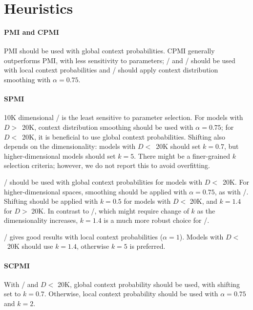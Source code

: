 \documentclass[11pt]{article}
\begin{document}

\section{Heuristics}

\paragraph{PMI and CPMI}

PMI should be used with global context probabilities. CPMI generally outperforms PMI, with less sensitivity to parameters; \NCPMI/ and \logNCPMI/ should be used with local context probabilities and \CPMI/ should apply context distribution smoothing with $\alpha = 0.75$.

\paragraph{SPMI}

10K dimensional \SPMI/ is the least sensitive to parameter selection. For models with $D>$~20K, context distribution smoothing should be used with $\alpha = 0.75$; for $D<$~20K, it is beneficial to use global context probabilities. Shifting also depends on the dimensionality: models with $D<$~20K should set $k = 0.7$, but higher-dimensional models should set $k = 5$. There might be a finer-grained $k$ selection criteria; however, we do not report this to avoid overfitting.

\logNSPMI/ should be used with global context probabilities for models with $D<$~20K. For higher-dimensional spaces, smoothing should be applied with $\alpha = 0.75$, as with \SPMI/. Shifting should be applied with $k = 0.5$ for models with $D<$ 20K,  and $k = 1.4$ for $D>$ 20K. In contrast to \SPMI/, which might require change of $k$ as the dimensionality increases, $k = 1.4$ is a much more robust choice for \logNSPMI/.

\NSPMI/ gives good results with local context probabilities ($\alpha = 1$). Models with $D<$~20K  should use $k = 1.4$, otherwise $k = 5$ is preferred.

\paragraph{SCPMI}

With \SCPMI/ and $D<$ 20K, global context probability should be used, with shifting set to $k = 0.7$. Otherwise, local context probability should be used with $\alpha = 0.75$ and $k = 2$.
\end{document}
